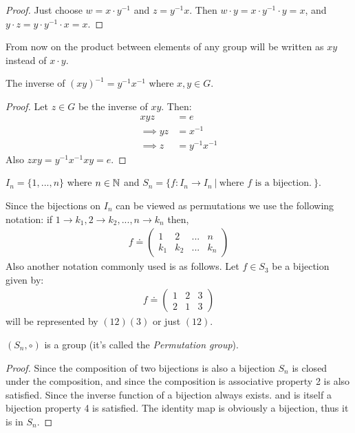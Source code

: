 \begin{proof}
  Just choose $w = x\cdot y^{-1}$ and $z = y^{-1} x$. Then $w\cdot y = x \cdot y^{-1} \cdot y = x$, and $y\cdot z = y \cdot y^{-1} \cdot x = x$.
\end{proof}
\begin{notation}
  From now on the product between elements of any group will be written as $xy$ instead of $x\cdot y$. 
\end{notation}
\begin{proposition}
  The inverse of $(xy)^{-1} = y^{-1} x^{-1}$ where $x,y\in G$.
\end{proposition}
\begin{proof}
  Let $z\in G$ be the inverse of $xy$. Then:
  \begin{align*}
    xyz &= e\\
    \implies yz &= x^{-1}\\
    \implies z &= y^{-1} x^{-1}
  \end{align*}
  Also $zxy = y^{-1} x^{-1} xy = e$.
\end{proof}
\begin{definition}
  $I_n = \{1,...,n\}$ where $n\in \mathbb{N}$ and  $S_n = \{f:I_n \to I_n\ |\ \text{where $f$ is a bijection.}\ \}$.
\end{definition}
\begin{notation}
  Since the bijections on $I_n$ can be viewed as permutations we use the following notation: if $1 \to k_1, 2\to k_2,..., n \to k_n$ then,
  \begin{align*}
    f \doteq \begin{pmatrix}
      1 & 2 & ... & n\\
      k_1 & k_2 & ... & k_n
    \end{pmatrix}
  \end{align*}
  Also another notation commonly used is as follows. Let $f\in S_3$ be a bijection given by:
  \begin{align*}
    f \doteq \begin{pmatrix}
      1 & 2 & 3\\
      2 & 1 & 3
    \end{pmatrix}
  \end{align*}
  will be represented by $(12)(3)$ or just $(12)$.
\end{notation}
\begin{proposition}
  $(S_n, \circ)$ is a group (it's called the \textit{Permutation group}).
\end{proposition}
\begin{proof}
  Since the composition of two bijections is also a bijection $S_n$ is closed under the composition, and since the composition is associative property 2 is also satisfied. Since the inverse function of a bijection always exists. and is itself a bijection property 4 is satisfied. The identity map is obviously a bijection, thus it is in $S_n$.
\end{proof}
